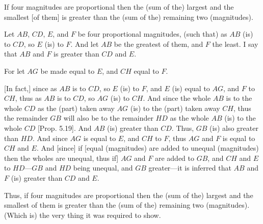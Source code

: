 \begin{Parallel}{}{}
{If four magnitudes are proportional then the (sum of the)
largest  and the smallest [of them] is greater than the (sum of the)  remaining two (magnitudes).

\epsfysize=1.4in
\centerline{}

Let $AB$, $CD$, $E$, and $F$ be four proportional magnitudes, (such that) as
$AB$ (is) to $CD$, so $E$ (is) to $F$. And let $AB$ be the greatest of them, and $F$ the least. I say that $AB$ and $F$ is greater than $CD$ and $E$.

For let $AG$ be made equal to $E$, and $CH$ equal to $F$.

\mbox{[}In fact,] since as $AB$ is to $CD$, so $E$ (is) to $F$, and $E$ (is) equal to $AG$, and
$F$ to $CH$,  thus as $AB$ is to $CD$, so $AG$ (is) to $CH$. And since the whole
$AB$ is to the whole $CD$ as the (part) taken away $AG$ (is) to the
(part) taken away $CH$, thus the remainder $GB$ will also be to the
remainder $HD$ as the whole $AB$ (is) to the whole $CD$ [Prop. 5.19]. And $AB$ (is) greater than $CD$.
Thus, $GB$ (is) also greater than $HD$. And since $AG$ is equal to $E$, and $CH$
to $F$, thus $AG$ and $F$ is equal to $CH$ and $E$. And [since] if [equal (magnitudes)
are added to unequal (magnitudes) then the wholes are unequal, thus if] $AG$ and $F$ are added to $GB$, and $CH$ and
$E$ to $HD$---$GB$ and
$HD$ being unequal, and $GB$ greater---it is inferred that $AB$ and $F$ (is) greater than $CD$ and $E$.

Thus, if four magnitudes are proportional then the (sum of the)
largest  and the smallest of them is greater than the (sum of the) remaining two (magnitudes). (Which is) the very thing it was required to show.}
\end{Parallel}


\vspace{7pt}{\footnotesize \noindent$^\dag$ In modern notation, this proposition
reads that if $\alpha:\beta::\gamma:\delta$, and $\alpha$ is the greatest and $\delta$ the least, then $\alpha+\delta>\beta+\gamma$.}
